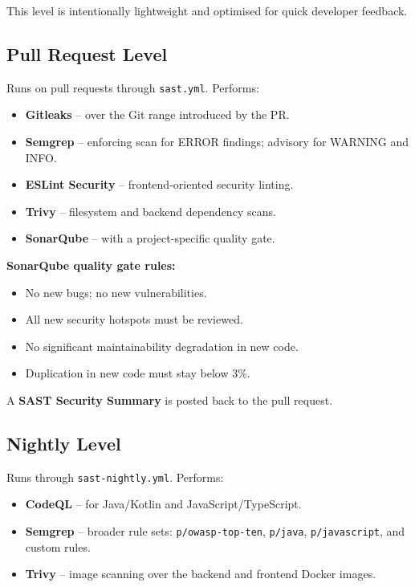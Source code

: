 \documentclass[12pt,a4paper]{report}
\begin{document}
This level is intentionally lightweight and optimised for quick developer feedback.

\subsection{Pull Request Level}

Runs on pull requests through \texttt{sast.yml}. Performs:
\begin{itemize}
  \item \textbf{Gitleaks} -- over the Git range introduced by the PR.
  \item \textbf{Semgrep} -- enforcing scan for ERROR findings; advisory for WARNING and INFO.
  \item \textbf{ESLint Security} -- frontend-oriented security linting.
  \item \textbf{Trivy} -- filesystem and backend dependency scans.
  \item \textbf{SonarQube} -- with a project-specific quality gate.
\end{itemize}

\textbf{SonarQube quality gate rules:}
\begin{itemize}
  \item No new bugs; no new vulnerabilities.
  \item All new security hotspots must be reviewed.
  \item No significant maintainability degradation in new code.
  \item Duplication in new code must stay below 3\%.
\end{itemize}

A \textbf{SAST Security Summary} is posted back to the pull request.

\subsection{Nightly Level}

Runs through \texttt{sast-nightly.yml}. Performs:
\begin{itemize}
  \item \textbf{CodeQL} -- for Java/Kotlin and JavaScript/TypeScript.
  \item \textbf{Semgrep} -- broader rule sets: \texttt{p/owasp-top-ten}, \texttt{p/java}, \texttt{p/javascript}, and custom rules.
  \item \textbf{Trivy} -- image scanning over the backend and frontend Docker images.
\end{itemize}
\end{document}
